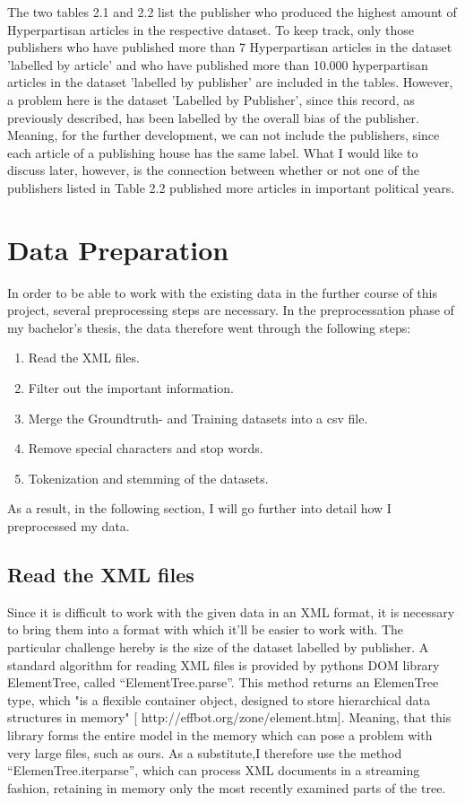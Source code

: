 \documentclass[a4paper, 11pt,titlepage,oneside,openany]{book}
\begin{document}
\noindent The two tables 2.1 and 2.2 list the publisher who produced the highest amount of Hyperpartisan articles in the respective dataset. To keep track, only those publishers who have published more than 7 Hyperpartisan articles in the dataset 'labelled by article' and who have published more than 10.000 hyperpartisan articles in the dataset 'labelled by publisher' are included in the tables. However, a problem here is the dataset 'Labelled by Publisher', since this record, as previously described, has been labelled by the overall bias of the publisher. Meaning, for the further development, we can not include the publishers, since each article of a publishing house has the same label. What I would like to discuss later, however, is the connection between whether or not one of the publishers listed in Table 2.2 published more articles in important political years.


\section{Data Preparation}
In order to be able to work with the existing data in the further course of this project, several preprocessing steps are necessary. In the preprocessation phase of my bachelor's thesis, the data therefore went through the following steps:
\begin{enumerate}
	\item Read the XML files. 
	\item Filter out the important information.
	\item Merge the Groundtruth- and Training datasets into a csv file.
	\item Remove special characters and stop words.
	\item Tokenization and stemming of the datasets.
\end{enumerate}	
\noindent As a result, in the following section, I will go further into detail how I preprocessed my data.


\subsection{Read the XML files}
Since it is difficult to work with the given data in an XML format, it is necessary to bring them into a format with which it’ll be easier to work with. The particular challenge hereby is the size of the dataset labelled by publisher. A standard algorithm for reading XML files is provided by pythons DOM library ElementTree, called “ElementTree.parse”. This method returns an ElemenTree type, which "is a flexible container object, designed to store hierarchical data structures in memory" [ http://effbot.org/zone/element.htm]. Meaning, that this library forms the entire model in the memory which can pose a problem with very large files, such as ours. As a substitute,I therefore use the method “ElemenTree.iterparse”, which can process XML documents in a streaming fashion, retaining in memory only the most recently examined parts of the tree. 
\end{document}
